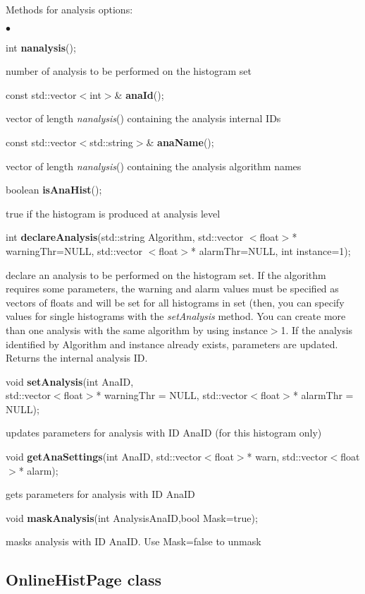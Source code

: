 \documentclass{lhcbnote}
\begin{document}
Methods for analysis options:
\begin{list}{$\bullet$}{}
\item   int {\bf  nanalysis}();

number of analysis to be performed on the histogram set
\item   const std::vector$<$int$>$\& {\bf anaId}();

vector of length {\it  nanalysis}() containing the analysis internal IDs
\item   const std::vector$<$std::string$>$\& {\bf anaName}();

vector of length {\it  nanalysis}() containing the analysis algorithm names
\item   boolean {\bf isAnaHist}();

true if the histogram is produced at analysis level
\item  int {\bf declareAnalysis}(std::string Algorithm, 
		      std::vector $<$float$>$* warningThr=NULL,  
		      std::vector $<$float$>$* alarmThr=NULL, 
		      int instance=1); 

declare an analysis to be performed on the histogram set. If the algorithm
requires some parameters, the warning and alarm values must be
specified as vectors of floats and will be set for all histograms in
set (then, you can specify values for single histograms with the {\it
setAnalysis} method. 
You can create more than one analysis
with the same algorithm by using instance$>$1. If the analysis
identified by Algorithm and instance already exists, parameters are
updated. Returns the internal analysis ID.

\item   void {\bf setAnalysis}(int AnaID, \\
		   std::vector$<$float$>$* warningThr = NULL, 
		   std::vector$<$float$>$* alarmThr = NULL);

updates parameters for analysis with ID AnaID (for this histogram only)
\item   void {\bf getAnaSettings}(int AnaID,
		      std::vector$<$float$>$* warn, 
		      std::vector$<$float$>$* alarm); 

gets parameters for analysis with ID AnaID
\item   void {\bf maskAnalysis}(int AnalysisAnaID,bool Mask=true); 

masks analysis with ID AnaID. Use Mask=false to unmask
\end{list}



\subsection{OnlineHistPage class}
\end{document}
